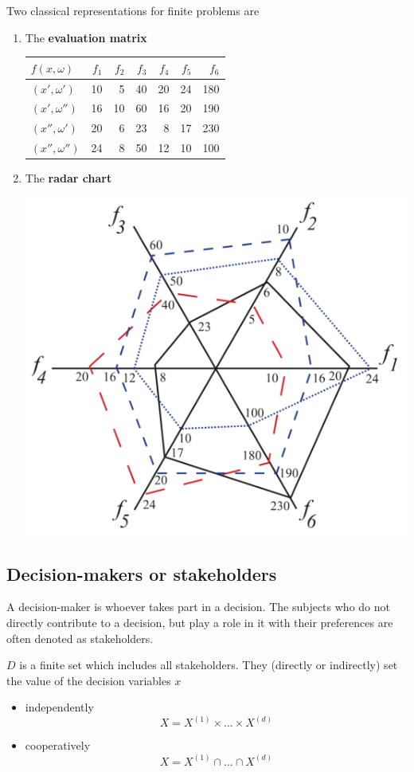 Two classical representations for finite problems are 
\begin{enumerate}
	\item The \textbf{evaluation matrix}
	\begin{center}
		\begin{tabular}{@{}l|rrrrrr@{}}
			\toprule
			\(f(x,\omega)\) & \(f_1\) & \(f_2\) & \(f_3\) & \(f_4\) & \(f_5\) & \(f_6\) \\
			\midrule
			\((x',\omega')\)   & 10 &  5 & 40 & 20 & 24 & 180 \\
			\((x',\omega'')\)  & 16 & 10 & 60 & 16 & 20 & 190 \\
			\((x'',\omega')\)  & 20 &  6 & 23 &  8 & 17 & 230 \\
			\((x'',\omega'')\) & 24 &  8 & 50 & 12 & 10 & 100 \\
			\bottomrule
		\end{tabular}
	\end{center}
	
	\item The \textbf{radar chart}
	\begin{center}
		\includegraphics[width=0.45\columnwidth]{img/dp/fundamentaldefinitions/chart1}
	\end{center}
\end{enumerate}

\subsection{Decision-makers or stakeholders}
\label{subsec:decisionmakersdef}

A decision-maker is whoever takes part in a decision. The subjects who do not directly contribute to a decision, but play a role in it with their preferences are often denoted as stakeholders.

$D$ is a finite set which includes all stakeholders. They (directly or indirectly) set the value of the decision variables $x$
\begin{itemize}
	\item independently
	$$ X = X^{(1)} \times \dots \times X^{(d)} $$
	
	\item cooperatively
	$$ X = X^{(1)} \cap \dots \cap X^{(d)} $$
\end{itemize}

